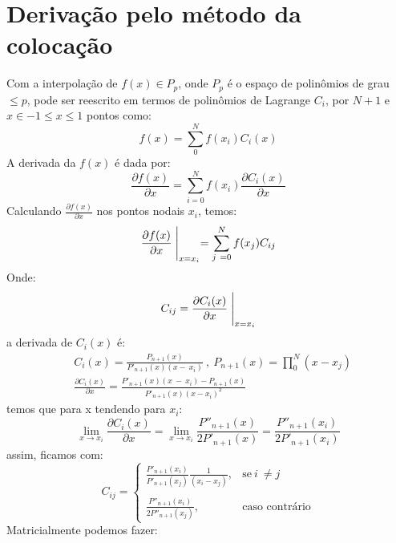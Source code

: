 \section{Derivação pelo método da colocação }
 Com a interpolação de $f(x) \in P_p$, onde $P_p$ é o espaço de polinômios de grau $\leq p$, pode ser reescrito em termos de polinômios de Lagrange $C_i$, por $N + 1$ e $x \in -1 \leq x \leq 1$ pontos como:
 \begin{equation}
 f(x)  = \sum^{N}_{0} f(x_i) C_i(x)
 \end{equation}
 A derivada da $f(x)$ é dada por:
 \begin{equation}
 \frac{\partial f(x)}{\partial x} = \sum^{N}_{i = 0} f(x_i) \frac{\partial C_i(x)}{\partial x}
 \end{equation}
 Calculando $\frac{\partial f(x)}{\partial x}$ nos pontos nodais $x_i$, temos:
\begin{equation}
   \frac{\partial f(x)}{\partial x}  \Biggm\lvert_{x=x_i} = \sum^{N}_{j\ = 0} f(x_j) C_{ij}
\end{equation}
 Onde:
 \begin{equation}
  C_{ij} = \frac{\partial C_i(x)}{\partial x} \Biggm\lvert_{x=x_i}
 \end{equation}
 a derivada de $C_i(x)$ é:
 \begin{align}
 &C_i(x) = \frac{P_{n+1}(x)}{P'_{n+1}(x)(x -\ x_i)}\ ,\ P_{n+1}(x) = \prod^{N}_{0} (x - x_j)\\
 &\frac{\partial C_i(x)}{\partial x} =  \frac{P'_{n+1}(x)(x\ -\ x_i) - P_{n+1}(x)}{P'_{n+1}(x)(x - x_i)^2}\ 
 \end{align}
 temos que para x tendendo para $x_i$:
 \begin{equation}
 \lim_{x \rightarrow x_i}  \frac{\partial C_i(x)}{\partial x} =  \lim_{x \rightarrow x_i} \frac{P''_{n+1}(x)}{2P'_{n+1}(x)} = \frac{P''_{n+1}(x_i)}{2P'_{n+1}(x_i)}
 \end{equation}
 assim, ficamos com:
 \begin{equation}\label{eq:test}
 C_{ij}= 
\begin{cases}
    \frac{P'_{n+1}(x_i)}{P'_{n+1}(x_j)} \frac{1}{(x_i - x_j)},& \text{se}\ i\ \neq  j\\\\
    \frac{P''_{n+1}(x_i)}{2P''_{n+1}(x_j)},              & \text{caso contrário}
\end{cases}
 \end{equation}
 Matricialmente podemos fazer:
